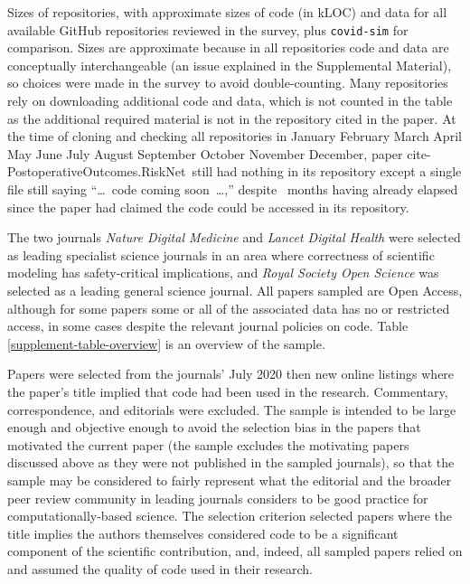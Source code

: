 \documentclass[10pt,a4paper]{article}
\def\supplement{Supplemental Material}
\def\cloneyear {2023}
\def\clonemonth {05}
\def\monthname#1{\ifcase#1 \or 
January\or 
February\or 
March\or 
April\or 
May\or 
June\or 
July\or 
August\or 
September\or 
October\or 
November\or 
December\fi}
\def\clonewhen{\monthname{\clonemonth} \cloneyear}
\begin{document}
\begin{table*}[t]
\caption{Sizes of repositories, with approximate sizes of code (in kLOC) and data for all available GitHub repositories reviewed in the survey, plus \texttt{covid-sim} \cite{ICmodel} for comparison. Sizes are approximate because in all repositories code and data are conceptually interchangeable (an issue explained in the \supplement), so choices were made in the survey to avoid double-counting. Many repositories rely on downloading additional code and data, which is not counted in the table as the additional required material is not in the repository cited in the paper.  At the time of cloning and checking all repositories in \clonewhen, paper \csname cite-PostoperativeOutcomes.RiskNet\endcsname\ still had nothing in its repository except a single file still saying ``\ldots\ code coming soon~\ldots,'' despite \the\pubdelayinmonths\ months having already elapsed since the  paper had claimed the code could be accessed in its repository.}
\label{supplement-table-repo-summary}
\end{table*}

The two journals \emph{Nature Digital Medicine\/} and \emph{Lancet Digital Health\/} were selected as leading specialist science journals in an area where correctness of scientific modeling has safety-critical implications, and \emph{Royal Society Open Science\/} was selected as a leading general science journal. All papers sampled are Open Access, although for some papers some or all of the associated data has no or restricted access, in some cases despite the relevant journal policies on code. Table \ref{supplement-table-overview} is an overview of the sample.  

Papers were selected from the journals' July 2020 then new online listings where the paper's title implied that code had been used in the research. Commentary, correspondence, and editorials were excluded. The sample is intended to be large enough and objective enough to avoid the selection bias in the papers that motivated the current paper (the sample excludes the motivating papers discussed above as they were not published in the sampled journals), so that the sample may be considered to fairly represent what the editorial and the broader peer review community in leading journals considers to be good practice for computationally-based science. The selection criterion selected papers where the title implies the authors themselves considered code to be a significant component of the scientific contribution, and, indeed, all sampled papers relied on and assumed the quality of code used in their research. 
\end{document}
